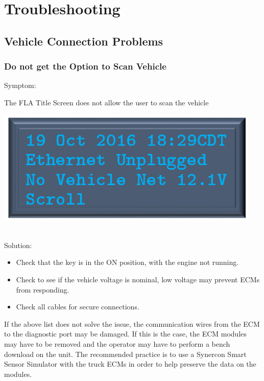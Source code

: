 \documentclass[11pt, oneside]{book}
\begin{document}
\chapter{Troubleshooting}

\section{Vehicle Connection Problems}
\subsection{Do not get the Option to Scan Vehicle}
Symptom:\\
\noindent\begin{minipage}{0.45\textwidth}%
The FLA Title Screen does not allow the user to scan the vehicle
\end{minipage}%
\hfill%
\begin{minipage}{0.45\textwidth}
\includegraphics[width=\linewidth]{../media/pstricks_files/01_main_screen_no_connections}
\end{minipage}\\
Solution:\\
\begin{itemize}
\item Check that the key is in the ON position, with the engine not running.
\item Check to see if the vehicle voltage is nominal, low voltage may prevent ECMs from responding.
\item Check all cables for secure connections.
\end{itemize}
If the above list does not solve the issue, the communication wires from the ECM to the diagnostic port may be damaged. If this is the case, the ECM modules may have to be removed and the operator may have to perform a bench download on the unit. The recommended practice is to use a Synercon Smart Sensor Simulator with the truck ECMs in order to help preserve the data on the modules.
\end{document}
